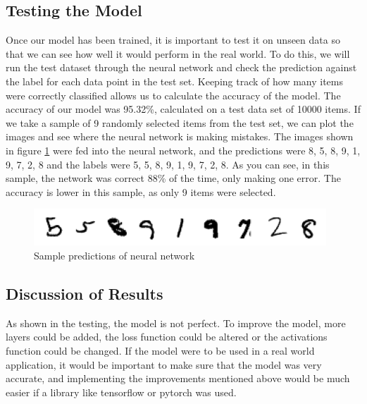 \documentclass[titlepage]{article}
\begin{document}
\subsection{Testing the Model}
Once our model has been trained, it is important to test it on unseen data so that we can see how well it would perform in the real world. To do this, we will run the test dataset through the neural network and check the prediction against the label for each data point in the test set. Keeping track of how many items were correctly classified allows us to calculate the accuracy of the model. The accuracy of our model was 95.32\%, calculated on a test data set of 10000 items. If we take a sample of 9 randomly selected items from the test set, we can plot the images and see where the neural network is making mistakes. The images shown in figure \ref{fig:sample-predictions} were fed into the neural network, and the predictions were 8, 5, 8, 9, 1, 9, 7, 2, 8 and the labels were 5, 5, 8, 9, 1, 9, 7, 2, 8. As you can see, in this sample, the network was correct 88\% of the time, only making one error. The accuracy is lower in this sample, as only 9 items were selected.
\begin{figure}[h!]
    \includegraphics[width=\linewidth]{assets/sample_predictions.png}
    \caption{Sample predictions of neural network}
    \label{fig:sample-predictions}
\end{figure}
 
\subsection{Discussion of Results}
As shown in the testing, the model is not perfect. To improve the model, more layers could be added, the loss function could be altered or the activations function could be changed. If the model were to be used in a real world application, it would be important to make sure that the model was very accurate, and implementing the improvements mentioned above would be much easier if a library like tensorflow or pytorch was used. 
\newpage
\end{document}
